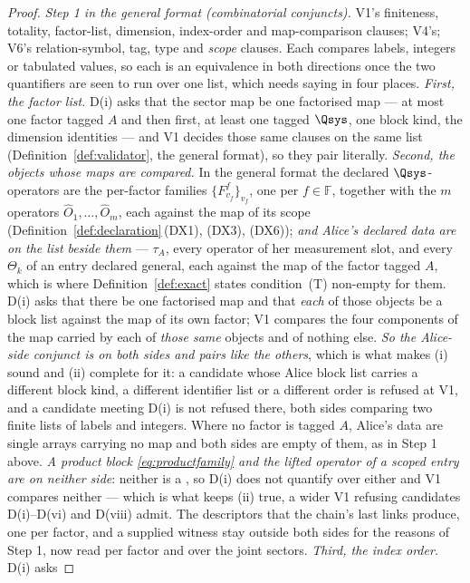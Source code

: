 \begin{proof}
\emph{Step 1 in the general format (combinatorial conjuncts).} V1's
finiteness, totality, factor-list, dimension, index-order and map-comparison
clauses; V4's; V6's relation-symbol, tag, type and \emph{scope} clauses. Each
compares labels, integers or tabulated values, so each is an equivalence in
both directions once the two quantifiers are seen to run over one list, which
needs saying in four places. \emph{First, the factor list.} D(i) asks that
the sector map be one factorised map --- at most one factor tagged $A$ and
then first, at least one tagged $\Qsys$, one block kind, the dimension
identities --- and V1 decides those same clauses on the same list
(Definition~\ref{def:validator}, the general format), so they pair literally.
\emph{Second, the objects whose maps are compared.} In the general format the
declared $\Qsys$-operators are the per-factor families
$\{F^{f}_{v_f}\}_{v_f}$, one per $f\in\mathbb{F}$, together with the $m$
operators $\hat O_1,\dots,\hat O_m$, each against the map of its scope
(Definition~\ref{def:declaration}\,(DX1), (DX3), (DX6)); \emph{and Alice's
declared data are on the list beside them} --- $\tau_A$, every operator of her
measurement slot, and every $\Theta_k$ of an entry declared general, each
against the map of the factor tagged $A$, which is where
Definition~\ref{def:exact} states condition~(T) non-empty for them. D(i) asks
that there be one factorised map and that \emph{each} of those objects be a
block list against the map of its own factor; V1 compares the four
components of the map carried by each of \emph{those same} objects and of
nothing else. \emph{So the Alice-side conjunct is on both sides and pairs like
the others}, which is what makes (i) sound and (ii) complete for it: a
candidate whose Alice block list carries a different block kind, a different
identifier list or a different order is refused at V1, and a candidate
meeting D(i) is not refused there, both sides comparing two finite lists of
labels and integers. Where no factor is tagged $A$, Alice's data are single
arrays carrying no map and both sides are empty of them, as in Step 1 above.
\emph{A product block \eqref{eq:productfamily} and the lifted operator of a
scoped entry are on neither side}: neither is a , so D(i) does
not quantify over either and V1 compares neither --- which is what keeps (ii)
true, a wider V1 refusing candidates D(i)--D(vi) and D(viii) admit. The
descriptors that the chain's last links produce, one per factor, and a
supplied witness stay outside both sides for the reasons of Step 1, now read
per factor and over the joint sectors. \emph{Third, the index order.} D(i) asks

\end{proof}
